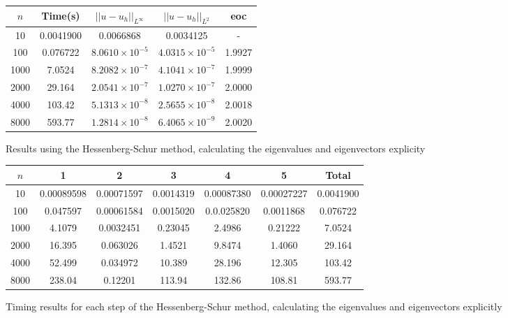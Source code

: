 \documentclass{article}
\numberwithin{equation}{section}
\begin{document}
\begin{figure}
\begin{table}[H]
\centering
\begin{tabular}{|c|c|c|c|c|}
\hline
$n$ & Time(s) & $|| u - u_h ||_{L^{\infty}}$ &$|| u - u_h ||_{L^{2}}$ & eoc \\
\hline
10 & 0.0041900 & 0.0066868 & 0.0034125 & - \\
100 & 0.076722 & $8.0610 \times 10^{-5}$ & $4.0315 \times 10^{-5}$ & 1.9927 \\
1000 & 7.0524 & $8.2082 \times 10^{-7}$ & $4.1041 \times 10^{-7}$ & 1.9999 \\
2000 & 29.164 & $2.0541 \times 10^{-7}$ & $1.0270 \times 10^{-7}$ & 2.0000 \\
4000 & 103.42 & $5.1313 \times 10^{-8}$ & $2.5655 \times 10^{-8}$ & 2.0018 \\
8000 & 593.77 & $1.2814 \times 10^{-8}$ & $6.4065 \times 10^{-9}$ & 2.0020 \\
\hline
\end{tabular}
\end{table}
\caption{Results using the Hessenberg-Schur method, calculating the eigenvalues and eigenvectors explicity}
\end{figure}

\begin{figure}
\begin{table}[H]
\centering
\begin{tabular}{|c|c|c|c|c|c|c|}
\hline
$n$ & 1 & 2 & 3 & 4 & 5 & Total \\
\hline
10 & 0.00089598 & 0.00071597 & 0.0014319 & 0.00087380 & 0.00027227 & 0.0041900 \\
100 & 0.047597 & 0.00061584 & 0.0015020 & 0.0.025820 & 0.0011868 & 0.076722 \\
1000 & 4.1079 & 0.0032451 & 0.23045 & 2.4986 & 0.21222 & 7.0524 \\
2000 & 16.395 & 0.063026 & 1.4521 & 9.8474 & 1.4060 & 29.164 \\
4000 & 52.499 & 0.034972 & 10.389 & 28.196 & 12.305 & 103.42 \\
8000 & 238.04 & 0.12201 & 113.94 & 132.86 & 108.81 & 593.77 \\
\hline
\end{tabular}
\end{table}
\caption{Timing results for each step of the Hessenberg-Schur method, calculating the eigenvalues and eigenvectors explicitly}
\end{figure}
\end{document}
